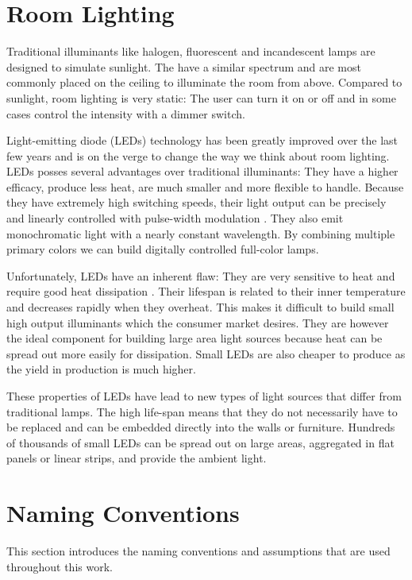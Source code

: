 \section{Room Lighting}

Traditional illuminants like halogen, fluorescent and incandescent lamps are designed to simulate sunlight.
The have a similar spectrum and are most commonly placed on the ceiling to illuminate the room from above.
Compared to sunlight, room lighting is very static: The user can turn it on or off and in some cases control the intensity with a dimmer switch.

Light-emitting diode (LEDs) technology has been greatly improved over the last few years and is on the verge to change the way we think about room lighting.
LEDs posses several advantages over traditional illuminants: 
They have a higher efficacy, produce less heat, are much smaller and more flexible to handle.
Because they have extremely high switching speeds, their light output can be precisely and linearly controlled  with pulse-width modulation \cite{muthu2002red}.
They also emit monochromatic light with a nearly constant wavelength. 
By combining multiple primary colors we can build digitally controlled full-color lamps.

Unfortunately, LEDs have an inherent flaw: They are very sensitive to heat and require good heat dissipation \cite{ellis2013auto}.
Their lifespan is related to their inner temperature and decreases rapidly when they overheat. 
This makes it difficult to build small high output illuminants which the consumer market desires. 
They are however the ideal component for building large area light sources because heat can be spread out more easily for dissipation.
Small LEDs are also cheaper to produce as the yield in production is much higher.

These properties of LEDs have lead to new types of light sources that differ from traditional lamps.
The high life-span means that they do not necessarily have to be replaced and can be embedded directly into the walls or furniture.
Hundreds of thousands of small LEDs can be spread out on large areas, aggregated in flat panels or linear strips, and provide the ambient light.


\section{Naming Conventions}
\label{sec:naming}
This section introduces the naming conventions and assumptions that are used throughout this work. 

